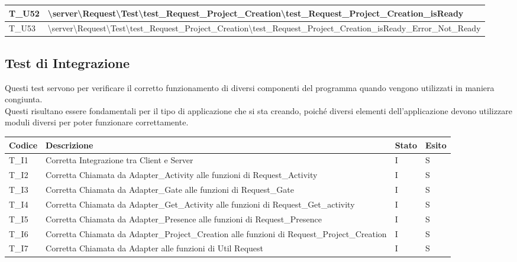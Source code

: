 \begin{center}
\begin{tabular}{|m{6em}|m{33em}|}
      \hline
      T\_U52 &\textbackslash server\textbackslash Request\textbackslash Test\textbackslash test\_Request\_Project\_Creation\newline \textbackslash test\_Request\_Project\_Creation\_isReady \\
      \hline
      T\_U53 &\textbackslash server\textbackslash Request\textbackslash Test\textbackslash test\_Request\_Project\_Creation\newline \textbackslash test\_Request\_Project\_Creation\_isReady\_Error\_Not\_Ready \\
      \hline
  \end{tabular}
\end{center}

\subsection{Test di Integrazione}
Questi test servono per verificare il corretto funzionamento di diversi componenti del programma quando vengono utilizzati in maniera congiunta. \\
Questi risultano essere fondamentali per il tipo di applicazione che si sta creando, poiché diversi elementi dell'applicazione devono utilizzare moduli diversi per poter funzionare correttamente.
\newline
\begin{tabular}{ |m{3em}|m{23em}|m{3em}|m{3em}| }
  \hline
  \textbf{Codice} & \textbf{Descrizione}  & \textbf{Stato} & \textbf{Esito}\\
  \hline
  T\_I1 & Corretta Integrazione tra Client e Server & I & S \\
  \hline
  T\_I2 & Corretta Chiamata da Adapter\_Activity alle funzioni di Request\_Activity & I & S \\
  \hline
  T\_I3 & Corretta Chiamata da Adapter\_Gate alle funzioni di Request\_Gate & I & S \\
  \hline
  T\_I4 & Corretta Chiamata da Adapter\_Get\_Activity alle funzioni di Request\_Get\_activity & I & S \\
  \hline
  T\_I5 & Corretta Chiamata da Adapter\_Presence alle funzioni di Request\_Presence & I & S \\
  \hline
  T\_I6 & Corretta Chiamata da Adapter\_Project\_Creation alle funzioni di Request\_Project\_Creation & I & S \\
  \hline
  T\_I7 & Corretta Chiamata da Adapter alle funzioni di Util Request & I & S \\
  \hline

\end{tabular}
